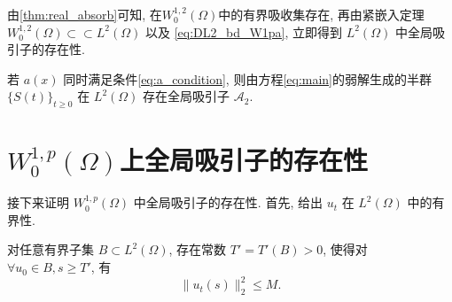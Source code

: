 \documentclass[oneside,longtitle]{LZUthesis}
\numberwithin{equation}{chapter}
\newcommand*\norm[1]{\lVert#1\rVert}
\newcommand*\Brace[1]{\lbrace#1\rbrace}
\begin{document}
由\cref{thm:real_absorb}可知, 在$W_0^{1, 2}(\Omega)$中的有界吸收集存在,
再由紧嵌入定理
$W_0^{1,2}(\Omega) \subset\subset L^2(\Omega)$ 以及 \cref{eq:DL2_bd_W1pa}, 
立即得到 $L^2(\Omega)$ 中全局吸引子的存在性.
\begin{theorem}\label{thm:attractor_L2}
	若 $a(x)$ 同时满足条件\eqref{eq:a_condition},
	则由方程\eqref{eq:main}的弱解生成的半群 $\Brace{S(t)}_{t \geq 0}$ 在
	$L^2(\Omega)$ 存在全局吸引子 $\mathcal{A}_2$.
\end{theorem}
\section{$W_0^{1,p}(\Omega)$上全局吸引子的存在性}
接下来证明 $W_0^{1,p}(\Omega)$ 中全局吸引子的存在性. 首先, 给出 $u_t$ 在 $L^2(\Omega)$ 中的有界性.
\begin{theorem}\label{thm:ut_L2_bd}
	对任意有界子集 $B \subset L^2(\Omega)$,
	存在常数 $T' = T'(B) > 0$, 使得对 $\forall u_0 \in B, s \geq T'$, 有
	\begin{equation*}
		\norm{u_t(s)}_2^2 \leq M.
	\end{equation*}
\end{theorem}
\end{document}
